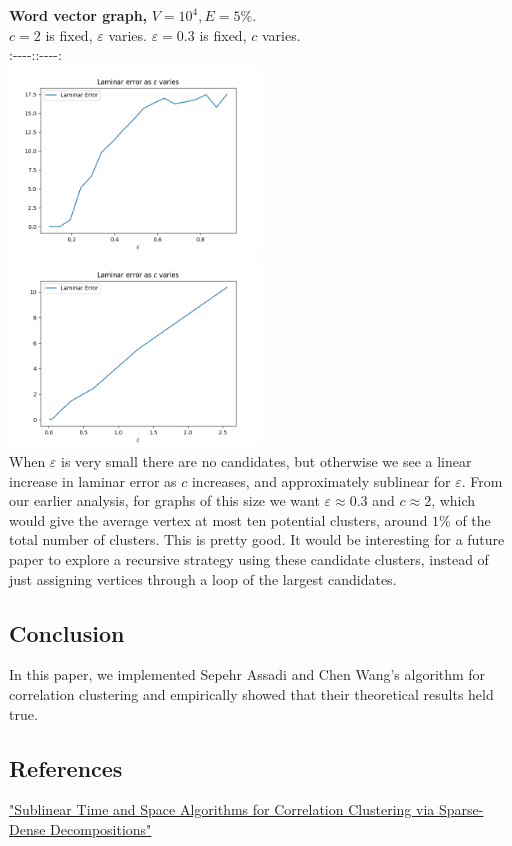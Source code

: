 \documentclass[
]{article}
\begin{document}
\textbf{Word vector graph,} {\(V = 10^{4},E = 5\%\)}.\\
{\(c = 2\)} is fixed, {\(\varepsilon\)} varies. \textbar{}
{\(\varepsilon = 0.3\)} is fixed, {\(c\)} varies.\\
:-\/-\/-\/-:\textbar:-\/-\/-\/-:\\
\includegraphics[width=0.5\textwidth]{images/laminar_error_as_epsilon_varies_word_vector.png}
\textbar{}
\includegraphics[width=0.5\textwidth]{images/laminar_error_as_c_varies_word_vector.png}\\
When {\(\varepsilon\)} is very small there are no candidates, but
otherwise we see a linear increase in laminar error as {\(c\)}
increases, and approximately sublinear for {\(\varepsilon\)}. From our
earlier analysis, for graphs of this size we want
  {\(\varepsilon \approx 0.3\)} and {\(c \approx 2\)}, which would give
the average vertex at most ten potential clusters, around {\(1\%\)} of
the total number of clusters. This is pretty good. It would be
interesting for a future paper to explore a recursive strategy using
these candidate clusters, instead of just assigning vertices through a
loop of the largest candidates.

\hypertarget{conclusion}{%
  \subsection{Conclusion}\label{conclusion}}

In this paper, we implemented Sepehr Assadi and Chen
Wang's algorithm for correlation clustering and
empirically showed that their theoretical results held true.

\hypertarget{references}{%
  \subsection{References}\label{references}}

\href{https://doi.org/10.48550/arxiv.2109.14528}{"Sublinear Time and
  Space Algorithms for Correlation Clustering via Sparse-Dense
  Decompositions"}
\end{document}
